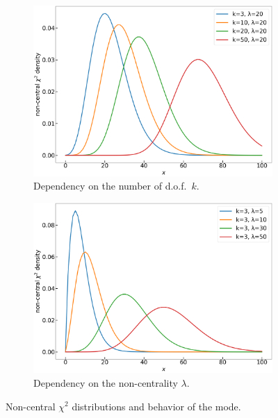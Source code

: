 \documentclass[final,5p,twocolumn,times,authoryear]{elsarticle}
\begin{document}
\begin{figure}[h]
	\centering
	\begin{subfigure}[t]{0.22\textwidth}
		\centering
		\includegraphics[width=\linewidth]{ncx2-of-df.png}
		\caption{Dependency on the number of d.o.f.~$k$.}\label{fig:ncx2-curves-df}
	\end{subfigure}
	\quad
	\begin{subfigure}[t]{0.22\textwidth}
		\centering
		\includegraphics[width=\linewidth]{ncx2-of-lambda.png}
		\caption{Dependency on the non-centrality $\lambda$.}\label{fig:ncx2-curves-lambda}
	\end{subfigure}
	\caption{Non-central $\chi^2$ distributions and behavior of the mode.}\label{fig:ncx2-curves}
\end{figure}
\end{document}
